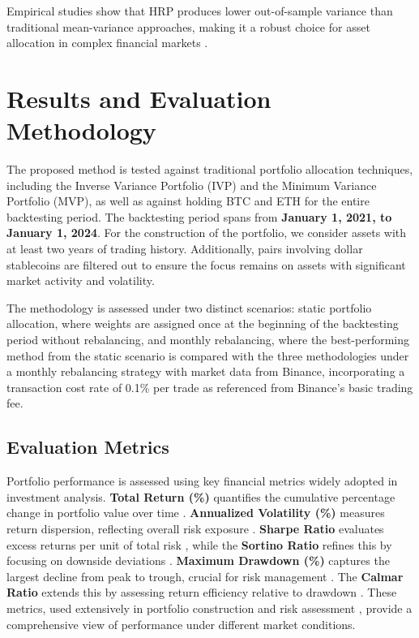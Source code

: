 \documentclass[english]{maciarticle}
\begin{document}
Empirical studies show that HRP produces lower out-of-sample variance than traditional mean-variance approaches, making it a robust choice for asset allocation in complex financial markets \cite{lopez2018}.

\section{Results and Evaluation Methodology}

The proposed method is tested against traditional portfolio allocation techniques, including the Inverse Variance Portfolio (IVP) and the Minimum Variance Portfolio (MVP), as well as against holding BTC and ETH for the entire backtesting period. The backtesting period spans from \textbf{January 1, 2021, to January 1, 2024}. For the construction of the portfolio, we consider assets with at least two years of trading history. Additionally, pairs involving dollar stablecoins are filtered out to ensure the focus remains on assets with significant market activity and volatility.

The methodology is assessed under two distinct scenarios: static portfolio allocation, where weights are assigned once at the beginning of the backtesting period without rebalancing, and monthly rebalancing, where the best-performing method from the static scenario is compared with the three methodologies under a monthly rebalancing strategy with market data from Binance, incorporating a transaction cost rate of 0.1\% per trade as referenced from Binance's basic trading fee.

\subsection{Evaluation Metrics}

Portfolio performance is assessed using key financial metrics widely adopted in investment analysis. \textbf{Total Return (\%)} quantifies the cumulative percentage change in portfolio value over time \cite{bacon2008}. \textbf{Annualized Volatility (\%)} measures return dispersion, reflecting overall risk exposure \cite{markowitz1952}. \textbf{Sharpe Ratio} evaluates excess returns per unit of total risk \cite{sharpe1994}, while the \textbf{Sortino Ratio} refines this by focusing on downside deviations \cite{sortino1994}. \textbf{Maximum Drawdown (\%)} captures the largest decline from peak to trough, crucial for risk management \cite{young1991}. The \textbf{Calmar Ratio} extends this by assessing return efficiency relative to drawdown \cite{young1991}. These metrics, used extensively in portfolio construction and risk assessment \cite{lopez2016, lopez2018}, provide a comprehensive view of performance under different market conditions.
\end{document}
